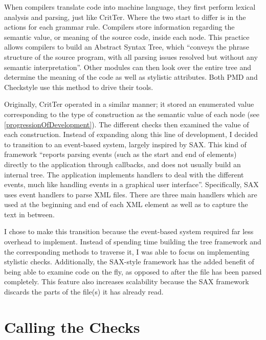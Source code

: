 \documentclass[12pt]{report}
\newcommand{\programName}{CritTer\xspace}
\begin{document}
When compilers translate code into machine language, they first perform lexical analysis and parsing, 
just like \programName. Where the two start to differ is in the actions for each grammar rule. Compilers 
store information regarding the semantic value, or meaning of the source code, inside each node. This 
practice allows compilers to build an Abstract Syntax Tree, which ``conveys the phrase structure of the 
source program, with all parsing issues resolved but without any semantic 
interpretation''\cite{compiler-implementation}. Other modules can then look over the entire tree and 
determine the meaning of the code as well as stylistic attributes. Both PMD and Checkstyle use this 
method to drive their tools. 

Originally, \programName operated in a similar manner; it stored an enumerated value corresponding to 
the type of construction as the semantic value of each node (see \autoref{progressionOfDevelopment}). 
The different checks then examined the value of each construction. Instead of expanding along this line 
of development, I decided to transition to an event-based system, largely inspired by 
SAX\cite{saxHomepage}. This kind of framework ``reports parsing events (such as the start and end of 
elements) directly to the application through callbacks, and does not usually build an internal tree. The 
application implements handlers to deal with the different events, much like handling events in a 
graphical user interface''\cite{saxHomepage}. Specifically, SAX uses event handlers to parse XML files. 
There are three main handlers which are used at the beginning and end of each XML element as well as 
to capture the text in between. 

I chose to make this transition because the event-based system required far less overhead to 
implement. Instead of spending time building the tree framework and the corresponding methods to 
traverse it, I was able to focus on implementing stylistic checks. Additionally, the SAX-style framework 
has the added benefit of being able to examine code on the fly, as opposed to after the file has been 
parsed completely. This feature also increases scalability because the SAX framework discards the parts 
of the file(s) it has already read.

\section{Calling the Checks}
\label{callingTheChecks}
\end{document}

